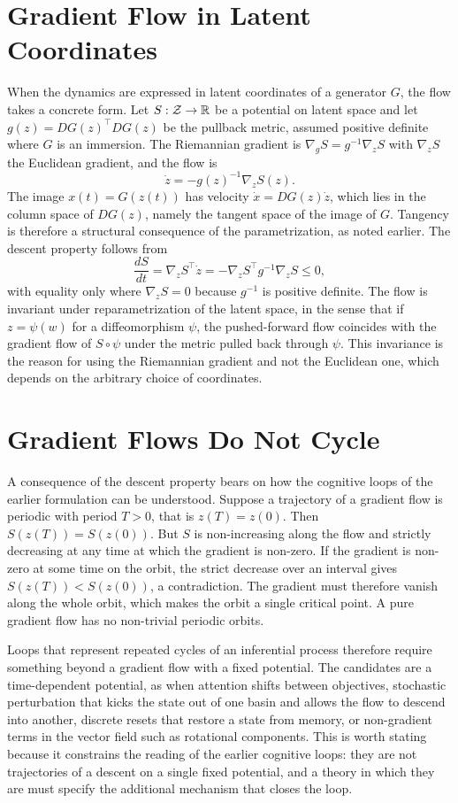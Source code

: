 \section{Gradient Flow in Latent Coordinates}

When the dynamics are expressed in latent coordinates of a generator $G$, the flow takes a concrete form. Let $S:\mathcal Z\to\mathbb{R}$ be a potential on latent space and let $g(z)=DG(z)^{\top}DG(z)$ be the pullback metric, assumed positive definite where $G$ is an immersion. The Riemannian gradient is $\nabla_gS=g^{-1}\nabla_zS$ with $\nabla_zS$ the Euclidean gradient, and the flow is
\[
\dot z=-g(z)^{-1}\nabla_zS(z).
\]
The image $x(t)=G(z(t))$ has velocity $\dot x=DG(z)\dot z$, which lies in the column space of $DG(z)$, namely the tangent space of the image of $G$. Tangency is therefore a structural consequence of the parametrization, as noted earlier. The descent property follows from
\[
\frac{dS}{dt}=\nabla_zS^{\top}\dot z=-\nabla_zS^{\top}g^{-1}\nabla_zS\le0,
\]
with equality only where $\nabla_zS=0$ because $g^{-1}$ is positive definite. The flow is invariant under reparametrization of the latent space, in the sense that if $z=\psi(w)$ for a diffeomorphism $\psi$, the pushed-forward flow coincides with the gradient flow of $S\circ\psi$ under the metric pulled back through $\psi$. This invariance is the reason for using the Riemannian gradient and not the Euclidean one, which depends on the arbitrary choice of coordinates.

\section{Gradient Flows Do Not Cycle}

A consequence of the descent property bears on how the cognitive loops of the earlier formulation can be understood. Suppose a trajectory of a gradient flow is periodic with period $T>0$, that is $z(T)=z(0)$. Then $S(z(T))=S(z(0))$. But $S$ is non-increasing along the flow and strictly decreasing at any time at which the gradient is non-zero. If the gradient is non-zero at some time on the orbit, the strict decrease over an interval gives $S(z(T))<S(z(0))$, a contradiction. The gradient must therefore vanish along the whole orbit, which makes the orbit a single critical point. A pure gradient flow has no non-trivial periodic orbits.

Loops that represent repeated cycles of an inferential process therefore require something beyond a gradient flow with a fixed potential. The candidates are a time-dependent potential, as when attention shifts between objectives, stochastic perturbation that kicks the state out of one basin and allows the flow to descend into another, discrete resets that restore a state from memory, or non-gradient terms in the vector field such as rotational components. This is worth stating because it constrains the reading of the earlier cognitive loops: they are not trajectories of a descent on a single fixed potential, and a theory in which they are must specify the additional mechanism that closes the loop.

